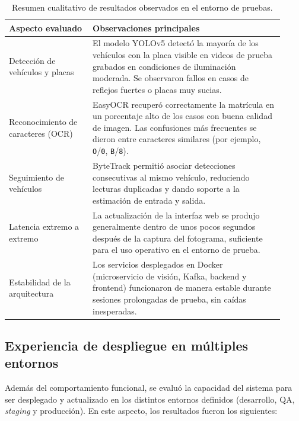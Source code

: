 \begin{table}[ht]
    \centering
    \caption{Resumen cualitativo de resultados observados en el entorno de pruebas.}
    \label{tab:resultados_resumen}
    \begin{tabular}{p{0.28\linewidth} p{0.64\linewidth}}
        \hline
        \textbf{Aspecto evaluado} & \textbf{Observaciones principales} \\
        \hline
        Detección de vehículos y placas &
        El modelo YOLOv5 detectó la mayoría de los vehículos con la placa visible en videos de prueba grabados en condiciones de iluminación moderada. Se observaron fallos en casos de reflejos fuertes o placas muy sucias. \\[0.4em]
        Reconocimiento de caracteres (OCR) &
        EasyOCR recuperó correctamente la matrícula en un porcentaje alto de los casos con buena calidad de imagen. Las confusiones más frecuentes se dieron entre caracteres similares (por ejemplo, \texttt{O}/\texttt{0}, \texttt{B}/\texttt{8}). \\[0.4em]
        Seguimiento de vehículos &
        ByteTrack permitió asociar detecciones consecutivas al mismo vehículo, reduciendo lecturas duplicadas y dando soporte a la estimación de entrada y salida. \\[0.4em]
        Latencia extremo a extremo &
        La actualización de la interfaz web se produjo generalmente dentro de unos pocos segundos después de la captura del fotograma, suficiente para el uso operativo en el entorno de prueba. \\[0.4em]
        Estabilidad de la arquitectura &
        Los servicios desplegados en Docker (microservicio de visión, Kafka, backend y frontend) funcionaron de manera estable durante sesiones prolongadas de prueba, sin caídas inesperadas. \\
        \hline
    \end{tabular}
\end{table}

\subsection{Experiencia de despliegue en múltiples entornos}

Además del comportamiento funcional, se evaluó la capacidad del sistema para ser desplegado y actualizado en los distintos entornos definidos (desarrollo, QA, \textit{staging} y producción). En este aspecto, los resultados fueron los siguientes:

